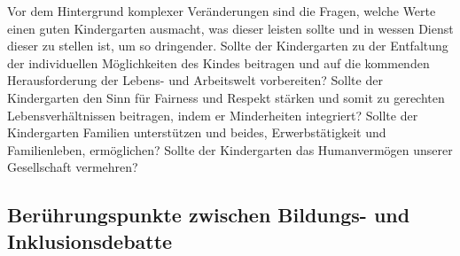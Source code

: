 Vor dem Hintergrund komplexer Veränderungen sind die Fragen, welche Werte einen guten Kindergarten ausmacht, was dieser leisten sollte und in wessen Dienst dieser zu stellen ist, um so dringender. Sollte der Kindergarten zu der Entfaltung der individuellen Möglichkeiten des Kindes beitragen und auf die kommenden Herausforderung der Lebens- und Arbeitswelt vorbereiten? Sollte der Kindergarten den Sinn für Fairness und Respekt stärken und somit zu gerechten Lebensverhältnissen beitragen, indem er Minderheiten integriert? Sollte der Kindergarten Familien unterstützen und beides, Erwerbstätigkeit und Familienleben, ermöglichen? Sollte der Kindergarten das Humanvermögen unserer Gesellschaft vermehren? 

\subsection{Berührungspunkte zwischen Bildungs- und Inklusionsdebatte}


